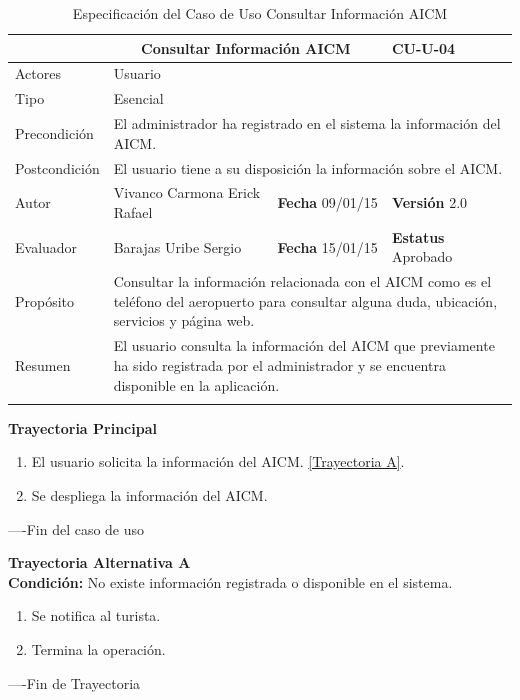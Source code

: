 \begin{longtable}{|p{2.5cm}|p{6.4cm}|p{2cm}|p{2cm}|}
	\hline
		\rowcolor[RGB]{51,153,255}{Caso de Uso}&\multicolumn{2}{c}{Consultar Información AICM}&{\textbf{CU-U-04}}\\
	\hline
		{Actores}&\multicolumn{3}{p{11.2cm}|}{Usuario}\\
	\hline
		{Tipo}&\multicolumn{3}{p{11.2cm}|}{Esencial}\\
	\hline
		{Precondición}&\multicolumn{3}{p{11.2cm}|}{El administrador ha registrado en el sistema la información del AICM.}\\
	\hline
		{Postcondición}&\multicolumn{3}{p{11.2cm}|}{El usuario tiene a su disposición la información sobre el AICM.}\\
	\hline
		{Autor}&{Vivanco Carmona Erick Rafael}&{\textbf{Fecha} 09/01/15}&{\textbf{Versión} 2.0}\\
			\hline
		{Evaluador}&{Barajas Uribe Sergio}&{\textbf{Fecha} 15/01/15}&{\textbf{Estatus} Aprobado}\\
	\hline
		{Propósito}&\multicolumn{3}{p{11.2cm}|}{Consultar la información relacionada con el AICM como es el teléfono del aeropuerto para consultar alguna duda, ubicación, servicios y página web.}\\
	\hline
		{Resumen}&\multicolumn{3}{p{11.2cm}|}{El usuario consulta la información del AICM que previamente ha sido registrada por el administrador y se encuentra disponible en la aplicación.}\\	
	\hline
	\caption[Especificación del Caso de Uso Consultar Información AICM]{Especificación del Caso de Uso Consultar Información AICM}
    	\label{tab:cuConsultarInformacionAICM}
\end{longtable}

\begin{flushleft}
	\textbf{Trayectoria Principal}\\
	\begin{enumerate}
		\item El usuario solicita la información del AICM. \hyperlink{TrayectoriaA_CU-U-04}{[Trayectoria A]}.
		\item Se despliega la información del AICM.
	\end{enumerate}
\end{flushleft}
----Fin del caso de uso

\begin{flushleft}
	\hypertarget{TrayectoriaA_CU-U-04}{}
	\textbf{Trayectoria Alternativa A}\\
	\textbf{Condición:} No existe información registrada o disponible en el sistema. \\
	\begin{enumerate}
		\item  Se notifica al turista. 
		\item Termina la operación.
	\end{enumerate}
\end{flushleft}
----Fin de Trayectoria
